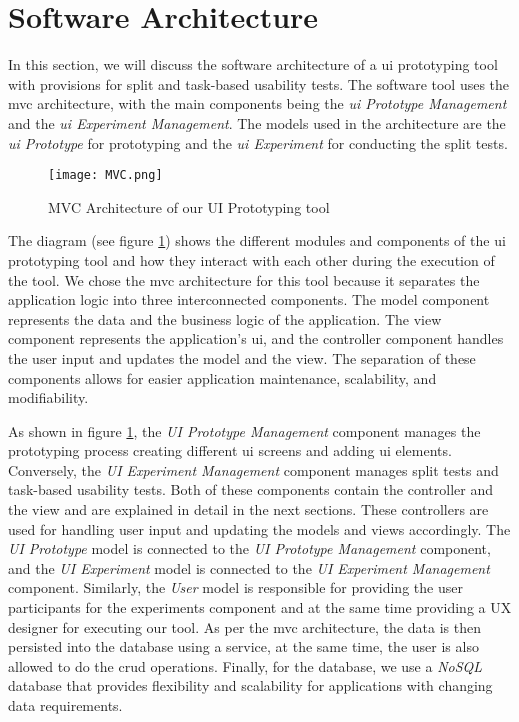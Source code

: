 \section{Software Architecture}
\label{sc:section:architecture}
In this section, we will discuss the software architecture of a \ac{ui} prototyping tool with provisions for split and task-based usability tests. 
The software tool uses the \ac{mvc} architecture, with the main components being the \textit{\ac{ui} Prototype Management} and the \textit{\ac{ui} Experiment Management}. 
The models used in the architecture are the \textit{\ac{ui} Prototype} for prototyping and the \textit{\ac{ui} Experiment} for conducting the split tests. 
\begin{figure}[htbp!]
    \centering    
    \texttt{[image: MVC.png]} 
    \caption[MVC Architecture of the System]{MVC Architecture of our UI Prototyping tool}
    \label{fig:sc:componentD}
\end{figure}
The diagram (see figure \ref{fig:sc:componentD}) shows the different modules and components of the \ac{ui} prototyping tool and how they interact with each other during the execution of the tool.
We chose the \ac{mvc} architecture for this tool because it separates the application logic into three interconnected components. 
The model component represents the data and the business logic of the application. 
The view component represents the application's \ac{ui}, and the controller component handles the user input and updates the model and the view. 
The separation of these components allows for easier application maintenance, scalability, and modifiability.

As shown in figure \ref{fig:sc:componentD}, the \textit{UI Prototype Management} component manages the prototyping process creating different \ac{ui} screens and adding \ac{ui} elements. 
Conversely, the \textit{UI Experiment Management} component manages split tests and task-based usability tests.
Both of these components contain the controller and the view and are explained in detail in the next sections. 
These controllers are used for handling user input and updating the models and views accordingly.
The \textit{UI Prototype} model is connected to the \textit{UI Prototype Management} component, and the \textit{UI Experiment} model is connected to the \textit{UI Experiment Management} component. 
Similarly, the \textit{User} model is responsible for providing the user participants for the experiments component and at the same time providing a UX designer for executing our tool.
As per the \ac{mvc} architecture, the data is then persisted into the database using a service, at the same time, the user is also allowed to do the \ac{crud} operations.  
Finally, for the database, we use a \textit{NoSQL} database that provides flexibility and scalability for applications with changing data requirements. 

